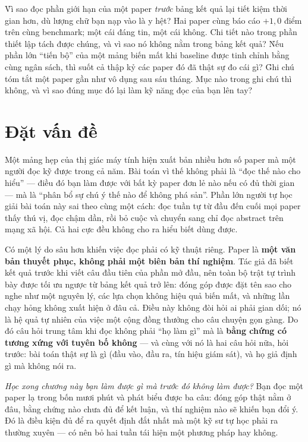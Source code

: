 \documentclass[../../deep_learning.tex]{subfiles}
\begin{document}
\begin{khoigoi}
\h{Vì sao đọc phần giới hạn của một paper \emph{trước} bảng kết quả lại tiết kiệm thời gian hơn, dù lượng chữ bạn nạp vào là y hệt?}
\h{Hai paper cùng báo cáo \(+1{,}0\) điểm trên cùng benchmark; một cái đáng tin, một cái không. Chi tiết nào trong phần thiết lập tách được chúng, và vì sao nó không nằm trong bảng kết quả?}
\h{Nếu phần lớn ``tiến bộ'' của một mảng biến mất khi baseline được tinh chỉnh bằng cùng ngân sách, thì suốt cả thập kỷ các paper đó đã thật sự đo cái gì?}
\h{Ghi chú tóm tắt một paper gần như vô dụng sau sáu tháng. Mục nào trong ghi chú thì không, và vì sao đúng mục đó lại làm kỹ năng đọc của bạn lên tay?}
\end{khoigoi}

\section{Đặt vấn đề}
Một mảng hẹp của thị giác máy tính hiện xuất bản nhiều hơn số paper mà một người đọc kỹ được trong cả năm. Bài toán vì thế không phải là ``đọc thế nào cho hiểu'' — điều đó bạn làm được với bất kỳ paper đơn lẻ nào nếu có đủ thời gian — mà là ``phân bổ sự chú ý thế nào để không phá sản''. Phần lớn người tự học giải bài toán này sai theo cùng một cách: đọc tuần tự từ đầu đến cuối mọi paper thấy thú vị, đọc chậm dần, rồi bỏ cuộc và chuyển sang chỉ đọc abstract trên mạng xã hội. Cả hai cực đều không cho ra hiểu biết dùng được.

Có một lý do sâu hơn khiến việc đọc phải có kỹ thuật riêng. Paper là \textbf{một văn bản thuyết phục, không phải một biên bản thí nghiệm}. Tác giả đã biết kết quả trước khi viết câu đầu tiên của phần mở đầu, nên toàn bộ trật tự trình bày được tối ưu ngược từ bảng kết quả trở lên: đóng góp được đặt tên sao cho nghe như một nguyên lý, các lựa chọn không hiệu quả biến mất, và những lần chạy hỏng không xuất hiện ở đâu cả. Điều này không đòi hỏi ai phải gian dối; nó là hệ quả tự nhiên của việc một cộng đồng thưởng cho câu chuyện gọn gàng. Do đó câu hỏi trung tâm khi đọc không phải ``họ làm gì'' mà là \textbf{bằng chứng có tương xứng với tuyên bố không} — và cùng với nó là hai câu hỏi nữa, hỏi trước: bài toán thật sự là gì (đầu vào, đầu ra, tín hiệu giám sát), và họ giả định gì mà không nói ra.

\emph{Học xong chương này bạn làm được gì mà trước đó không làm được?} Bạn đọc một paper lạ trong bốn mươi phút và phát biểu được ba câu: đóng góp thật nằm ở đâu, bằng chứng nào chưa đủ để kết luận, và thí nghiệm nào sẽ khiến bạn đổi ý. Đó là điều kiện đủ để ra quyết định đắt nhất mà một kỹ sư tự học phải ra thường xuyên --- có nên bỏ hai tuần tái hiện một phương pháp hay không.
\end{document}
